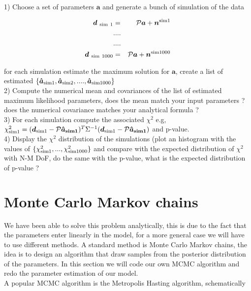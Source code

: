 \documentclass[a4paper]{article}
\def\ba{\begin{eqnarray}}
\def\ea{\end{eqnarray}}
\begin{document}
1)  Choose a set of parameters $\bm{a}$ and generate a bunch of simulation of the data 

\ba
{\bm d}_{\ \rm sim \ 1} &=& {\cal P} \bm{a} + {\bm n}^{\rm sim 1} \\
&....& \nonumber \\
&....& \nonumber  \\
{\bm d}_{\ \rm sim \  1000} &=& {\cal P}\bm{a} + {\bm n}^{\rm sim 1000}
\ea

for each simulation estimate the maximum solution for  $\bm{a}$, create a list of estimated $\{ \bm{\hat{a}}_{\rm sim 1}, \bm{\hat{a}}_{\rm sim 2}, ...., \bm{\hat{a}}_{\rm sim 1000} \}$ \\

2) Compute the numerical mean and covariances of the list of estimated maximum likelihood parameters, does the mean match your input parameters ? does the numerical covariance matches your analytical formula ? \\

3) For each simulation compute the associated $\chi^{2}$ e.g,  $\chi^{2}_{\rm sim 1 } = ({\bm d}_{\rm sim 1}  - {\cal P}\bm{\hat{a}_{\rm sim 1}})^{T} \Sigma^{-1} ({\bm d}_{\rm sim 1}  - {\cal P}\bm{\hat{a}_{\rm sim 1}})$ and p-value.  \\

4) Display the $\chi^{2}$ distribution of the simulations (plot an histogram with the values of $\{\chi^{2}_{\rm sim 1 }, ..., \chi^{2}_{\rm sim 1000  } \}$ and compare with the expected distribution of $\chi^{2}$ with N-M DoF, do the same with the p-value, what is the expected distribution of p-value ?


 \section{Monte Carlo Markov chains}

We have been able to solve this problem analytically, this is due to the fact that the parameters enter linearly in the model, for a more general case we will have to use different methods.
A standard method is Monte Carlo Markov chains, the idea is to design an algorithm that draw samples from the posterior distribution of the parameters. In this section we will code our own MCMC algorithm and redo the parameter estimation of our model. \\

A popular MCMC algorithm is the Metropolis Hasting algorithm, schematically
\end{document}
